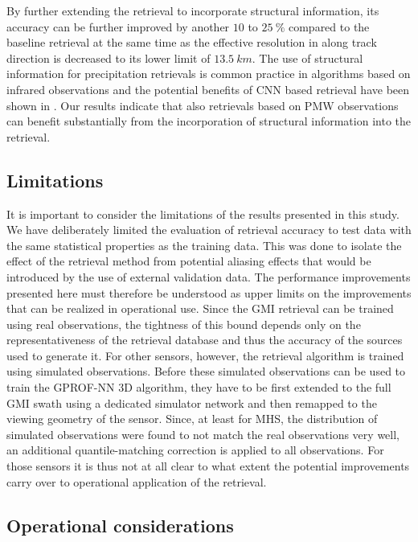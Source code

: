 \documentclass[a4paper,11pt,bibtotoc]{scrartcl}
\begin{document}
By further extending the retrieval to incorporate structural information, its
accuracy can be further improved by another $10$ to $25\ \unit{\%}$
compared to the baseline retrieval at the same time as the effective resolution
in along track direction is decreased to its lower limit of $13.5\ \unit{km}$.
The use of structural information for precipitation retrievals is common
practice in algorithms based on infrared observations \citep{sorooshian00,
  hong04} and the potential benefits of CNN based retrieval have been shown in
\citet{sadeghi19}. Our results indicate that also retrievals based on PMW
observations can benefit substantially from the incorporation of structural
information into the retrieval.

\subsection{Limitations}

It is important to consider the limitations of the results presented in this
study. We have deliberately limited the evaluation of retrieval accuracy to test
data with the same statistical properties as the training data. This was done to
isolate the effect of the retrieval method from potential aliasing effects that
would be introduced by the use of external validation data. The performance
improvements presented here must therefore be understood as upper limits on the
improvements that can be realized in operational use. Since the GMI retrieval
can be trained using real observations, the tightness of this bound depends only
on the representativeness of the retrieval database and thus the accuracy of the
sources used to generate it. For other sensors, however, the retrieval algorithm
is trained using simulated observations. Before these simulated observations can
be used to train the GPROF-NN 3D algorithm, they have to be first extended to
the full GMI swath using a dedicated simulator network and then remapped to the
viewing geometry of the sensor. Since, at least for MHS, the distribution of
simulated observations were found to not match the real observations very well,
an additional quantile-matching correction is applied to all observations. For
those sensors it is thus not at all clear to what extent the potential
improvements carry over to operational application of the retrieval.

\subsection{Operational considerations}
\end{document}
